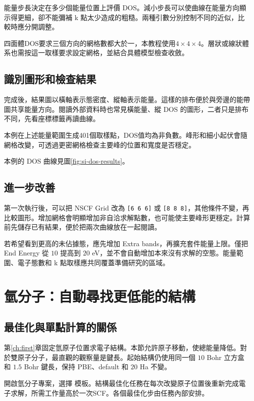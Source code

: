 能量步長決定在多少個能量位置上評價 DOS。減小步長可以使曲線在能量方向顯示得更細，卻不能彌補 k 點太少造成的粗糙。兩種引數分別控制不同的近似，比較時應分開調整。

四面體DOS要求三個方向的網格數都大於一，本教程使用$4\times4\times4$。層狀或線狀體系也需按這一取樣要求設定網格，並結合具體模型檢查收斂。


\subsection{識別圖形和檢查結果}

完成後，結果圖以橫軸表示態密度、縱軸表示能量。這樣的排布便於與旁邊的能帶圖共享能量方向。閱讀外部資料時也常見橫能量、縱 DOS 的圖形，二者只是排布不同，先看座標標籤再讀曲線。

本例在上述能量範圍生成401個取樣點，DOS值均為非負數。峰形和細小起伏會隨網格改變，可透過更密網格檢查主要峰的位置和寬度是否穩定。

本例的 DOS 曲線見圖\ref{fig:si-dos-results}。

\subsection{進一步改善 }

第一次執行後，可以把 NSCF Grid 改為 \texttt{[6 6 6]} 或 \texttt{[8 8 8]}，其他條件不變，再比較圖形。增加網格會明顯增加非自洽求解點數，也可能使主要峰形更穩定。計算前先儲存已有結果，便於把兩次曲線放在一起閱讀。

若希望看到更高的未佔據態，應先增加 Extra bands，再擴充套件能量上限。僅把 End Energy 從 $10$ 提高到 $20$ eV，並不會自動增加本來沒有求解的空態。能量範圍、電子態數和 k 點取樣應共同覆蓋準備研究的區域。

\section{氫分子：自動尋找更低能的結構}

\subsection{最佳化與單點計算的關係}

第\ref{ch:first}章固定氫原子位置求電子結構。本節允許原子移動，使總能量降低。對於雙原子分子，最直觀的觀察量是鍵長。起始結構仍使用同一個 $10$ Bohr 立方盒和 $1.5$ Bohr 鍵長，保持 PBE、default 和 $20$ Ha 不變。

開啟氫分子專案，選擇  模板。結構最佳化任務在每次改變原子位置後重新完成電子求解，所需工作量高於一次SCF。各個最佳化步由任務內部安排。


